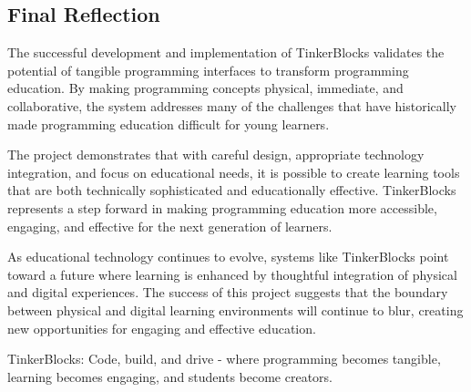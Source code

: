 \subsection{Final Reflection}

The successful development and implementation of TinkerBlocks validates the potential of tangible programming interfaces to transform programming education. By making programming concepts physical, immediate, and collaborative, the system addresses many of the challenges that have historically made programming education difficult for young learners.

The project demonstrates that with careful design, appropriate technology integration, and focus on educational needs, it is possible to create learning tools that are both technically sophisticated and educationally effective. TinkerBlocks represents a step forward in making programming education more accessible, engaging, and effective for the next generation of learners.

As educational technology continues to evolve, systems like TinkerBlocks point toward a future where learning is enhanced by thoughtful integration of physical and digital experiences. The success of this project suggests that the boundary between physical and digital learning environments will continue to blur, creating new opportunities for engaging and effective education.

TinkerBlocks: Code, build, and drive - where programming becomes tangible, learning becomes engaging, and students become creators.